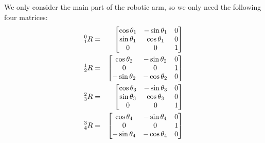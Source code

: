 \documentclass{article}
\begin{document}
We only consider the main part of the robotic arm, so we only need the following four matrices:
\begin{eqnarray*}
    \prescript{0}{1}{R} &=&
    \begin{bmatrix}
        \cos \theta_1 & - \sin \theta_1 & 0  \\
        \sin \theta_1 & \cos \theta_1 & 0  \\
        0 & 0 & 1  \\
    \end{bmatrix} \\
    \prescript{1}{2}{R} &=&
    \begin{bmatrix}
        \cos \theta_2 & - \sin \theta_2 & 0  \\
        0 & 0 & 1 \\
        -\sin \theta_2 & - \cos \theta_2 & 0
    \end{bmatrix} \\
    \prescript{2}{3}{R} &=&
    \begin{bmatrix}
        \cos \theta_3 & - \sin \theta_3 & 0  \\
        \sin \theta_3 & \cos \theta_3 & 0 \\
        0 & 0 & 1
    \end{bmatrix} \\
    \prescript{3}{4}{R} &=&
    \begin{bmatrix}
        \cos \theta_4 & - \sin \theta_4 & 0 \\
        0 & 0 & 1 \\
        -\sin \theta_4 & - \cos \theta_4 & 0
    \end{bmatrix} \\
\end{eqnarray*}
\end{document}
